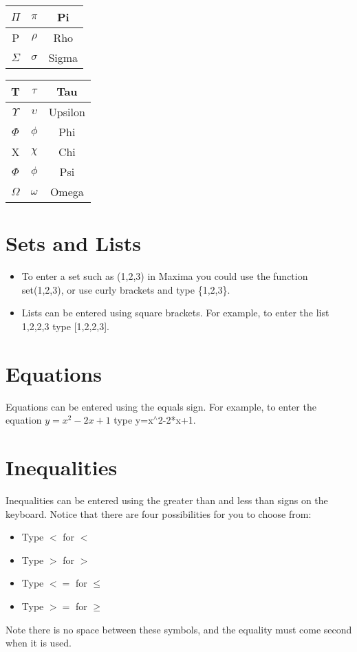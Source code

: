 \documentclass[a4paper]{article}
\begin{document}
\begin{multicols}{2}
\begin{table}[H]
\begin{minipage}{0.22\linewidth}
\begin{tabular}{|c|c|c|}
$\Pi$ & $\pi$ & Pi \\ \hline
P & $\rho$ & Rho \\ \hline
$\Sigma$ & $\sigma$ & Sigma \\ \hline
\end{tabular}
\end{minipage}
\hspace{0.2cm}
\begin{minipage}{0.22\linewidth}
\centering
\begin{tabular}{|c|c|c|} \hline
T & $\tau$ & Tau \\ \hline
$\Upsilon$ & $\upsilon$ & Upsilon \\ \hline
$\Phi$ & $\phi$ & Phi \\ \hline
X & $\chi$ & Chi \\ \hline
$\Phi$ & $\phi$ & Psi \\ \hline
$\Omega$ & $\omega$ & Omega \\ \hline
\end{tabular}
\end{minipage}
\end{table}

\section*{Sets and Lists}
\begin{itemize}
\item To enter a set such as ({1,2,3}) in Maxima you could use the function set(1,2,3), or use curly brackets and type \{1,2,3\}.
\item Lists can be entered using square brackets. For example, to enter the list 1,2,2,3 type [1,2,2,3].
\end{itemize}

\section*{Equations}
Equations can be entered using the equals sign. For example, to enter the equation $y=x^2-2x+1$ type y=x$^{\wedge}$2-2*x+1.

\section*{Inequalities}
Inequalities can be entered using the greater than and less than signs on the keyboard. Notice that there are four possibilities for you to choose from:
\begin{itemize}
\item Type $<$ for $<$
\item Type $>$ for $>$
\item Type $<=$ for $\leq$
\item Type $>=$ for $\geq$
\end{itemize}
Note there is no space between these symbols, and the equality must come second when it is used.

\end{multicols}
\end{document}
